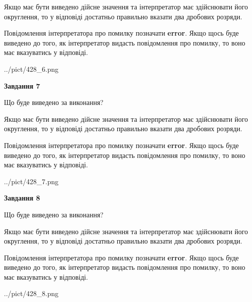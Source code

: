 \documentclass[12pt, ukrainian]{article}
\begin{document}
{\begin {Large}
Якщо має бути виведено дійсне значення та інтерпретатор має здійснювати його округлення, 
то у відповіді достатньо правильно вказати два дробових розряди.

Повідомлення інтерпретатора про помилку позначати \textbf{error}.
Якщо щось буде виведено до того, як інтерпретатор видасть повідомлення про помилку, 
то воно має вказуватись у відповіді. \par

\begin{center}
	{../pict/428_6.png}
\end{center}
\newpage

{\begin {center}\textbf{Завдання 7}\end {center}}\par
Що буде виведено за виконання? \par

Якщо має бути виведено дійсне значення та інтерпретатор має здійснювати його округлення, 
то у відповіді достатньо правильно вказати два дробових розряди.

Повідомлення інтерпретатора про помилку позначати \textbf{error}.
Якщо щось буде виведено до того, як інтерпретатор видасть повідомлення про помилку, 
то воно має вказуватись у відповіді. \par

\begin{center}
	{../pict/428_7.png}
\end{center}
\newpage

{\begin {center}\textbf{Завдання 8}\end {center}}\par
Що буде виведено за виконання? \par

Якщо має бути виведено дійсне значення та інтерпретатор має здійснювати його округлення, 
то у відповіді достатньо правильно вказати два дробових розряди.

Повідомлення інтерпретатора про помилку позначати \textbf{error}.
Якщо щось буде виведено до того, як інтерпретатор видасть повідомлення про помилку, 
то воно має вказуватись у відповіді. \par

\begin{center}
	{../pict/428_8.png}
\end{center}
\newpage


\end{Large}}
\end{document}
